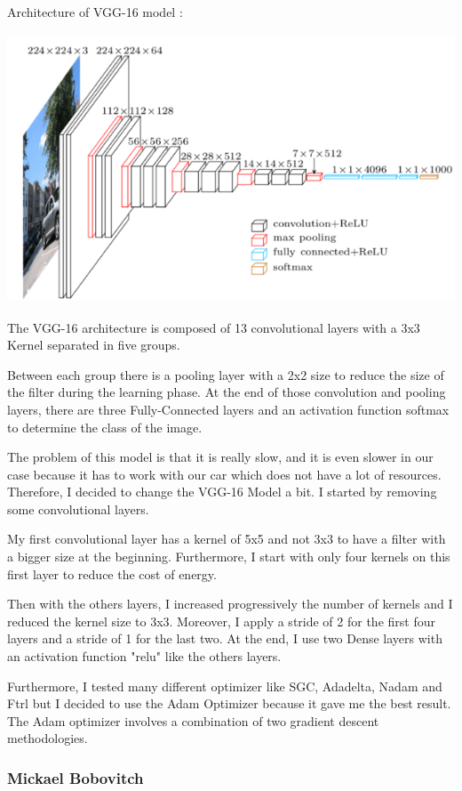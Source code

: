 \documentclass[12pt]{article}
\begin{document}
Architecture of VGG-16 model :

\centerline{\includegraphics[height=8cm]{../../docs/VGG16.png}}


The VGG-16 architecture is composed of 13 convolutional layers with a 3x3 Kernel separated in five groups.

Between each group there is a pooling layer with a 2x2 size to reduce the size of the filter during the learning phase. At the end of those convolution and pooling layers, there are three Fully-Connected layers and an activation function softmax to determine the class of the image.


The problem of this model is that it is really slow, and it is even slower in our case because it has to work with our car which does not have a lot of resources. Therefore, I decided to change the VGG-16 Model a bit. 
I started by removing some convolutional layers.

My first convolutional layer has a kernel of 5x5 and not 3x3 to have a filter with a bigger size at the beginning. Furthermore, I start with only four kernels on this first layer to reduce the cost of energy.

Then with the others layers, I increased progressively the number of kernels and I reduced the kernel size to 3x3. Moreover, I apply a stride of 2 for the first four layers and a stride of 1 for the last two. At the end, I use two Dense layers with an activation function "relu" like the others layers.


Furthermore, I tested many different optimizer like SGC, Adadelta, Nadam and Ftrl but I decided to use the Adam Optimizer because it gave me the best result. The Adam optimizer involves a combination of two gradient descent methodologies.


\subsubsection{Mickael Bobovitch}
\end{document}
